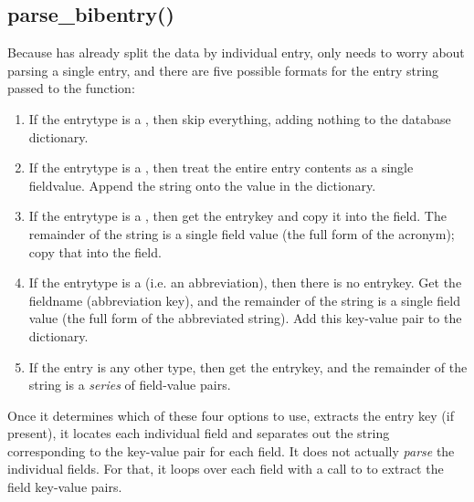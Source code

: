 \documentclass[letterpaper,10pt,english]{sphinxmanual}
\begin{document}
\subsection{parse\_bibentry()}
\label{developer_guide:parse-bibentry}
Because  has already split the data by individual entry,  only needs to worry about parsing a single entry, and there are five possible formats for the entry string passed to the function:
\begin{enumerate}
\item {} 
If the entrytype is a , then skip everything, adding nothing to the database dictionary.

\item {} 
If the entrytype is a , then treat the entire entry contents as a single fieldvalue. Append the string onto the  value in the  dictionary.

\item {} 
If the entrytype is a , then get the entrykey and copy it into the  field. The remainder of the string is a single field value (the full form of the acronym); copy that into the  field.

\item {} 
If the entrytype is a  (i.e. an abbreviation), then there is no entrykey. Get the fieldname (abbreviation key), and the remainder of the string is a single field value (the full form of the abbreviated string). Add this key-value pair to the  dictionary.

\item {} 
If the entry is any other type, then get the entrykey, and the remainder of the string is a \emph{series} of field-value pairs.

\end{enumerate}

Once it determines which of these four options to use,  extracts the entry key (if present), it locates each individual field and separates out the string corresponding to the key-value pair for each field. It does not actually \emph{parse} the individual fields. For that, it loops over each field with a call to  to extract the field key-value pairs.
\end{document}
